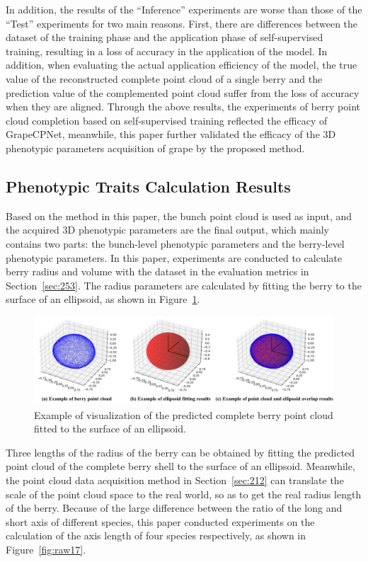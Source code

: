 \documentclass[12pt]{article}
\begin{document}
In addition, the results of the ``Inference'' experiments are worse than those of the ``Test'' experiments for two main reasons.
First, there are differences between the dataset of the training phase and the application phase of self-supervised training, resulting in a loss of accuracy in the application of the model. 
In addition, when evaluating the actual application efficiency of the model, the true value of the reconstructed complete point cloud of a single berry and the prediction value of the complemented point cloud suffer from the loss of accuracy when they are aligned.
Through the above results, the experiments of berry point cloud completion based on self-supervised training reflected the efficacy of GrapeCPNet, meanwhile, this paper further validated the efficacy of the 3D phenotypic parameters acquisition of grape by the proposed method.

\subsection{Phenotypic Traits Calculation Results}

Based on the method in this paper, the bunch point cloud is used as input, and the acquired 3D phenotypic parameters are the final output, which mainly contains two parts: the bunch-level phenotypic parameters and the berry-level phenotypic parameters.
In this paper, experiments are conducted to calculate berry radius and volume with the dataset in the evaluation metrics in Section~\ref{sec:253}.
The radius parameters are calculated by fitting the berry to the surface of an ellipsoid, as shown in Figure~\ref{fig:raw16}.

\begin{figure}[hbt!]
    \centering
    \includegraphics[width=1\textwidth]{figures/Figure13.pdf}
    \caption{Example of visualization of the predicted complete berry point cloud fitted to the surface of an ellipsoid.}
    \label{fig:raw16}
\end{figure}

Three lengths of the radius of the berry can be obtained by fitting the predicted point cloud of the complete berry shell to the surface of an ellipsoid. 
Meanwhile, the point cloud data acquisition method in Section~\ref{sec:212} can translate the scale of the point cloud space to the real world, so as to get the real radius length of the berry.
Because of the large difference between the ratio of the long and short axis of different species, this paper conducted experiments on the calculation of the axis length of four species respectively, as shown in Figure~\ref{fig:raw17}.
\end{document}
